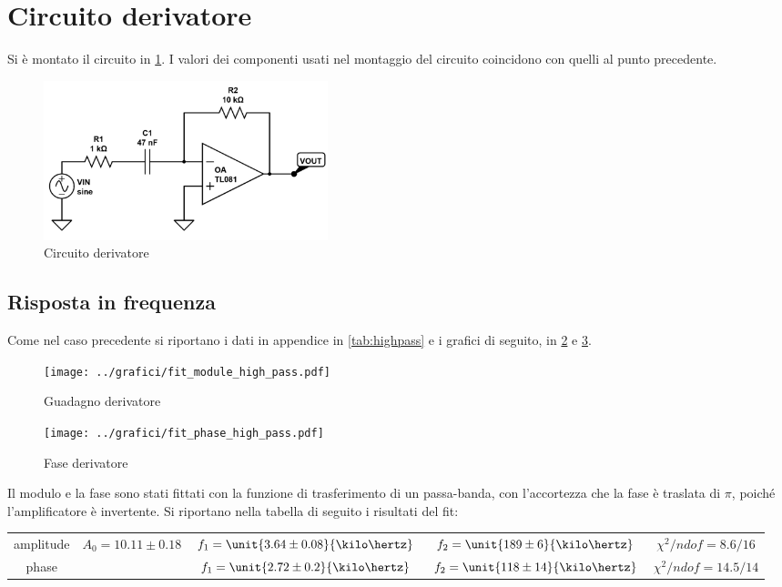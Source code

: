 \documentclass[10pt,a4paper]{article}
\begin{document}
\section{Circuito derivatore}

Si è montato il circuito in \figurename{\ref{derivatore}}. I valori dei componenti usati nel montaggio del circuito coincidono con quelli al punto precedente.

\begin{figure}[H]
	\centering
	\includegraphics[width=0.4\textwidth]{../grafici/derivatore_circuito.jpg}
	\caption{Circuito derivatore}
	\label{derivatore}
\end{figure}

\subsection{Risposta in frequenza}

Come nel caso precedente si riportano i dati in appendice in \tablename{\ref{tab:highpass}} e i grafici di seguito, in \figurename{\ref{fig:highamp}} e \figurename{\ref{fig:highph}}.

	\begin{figure}[H]
		\centering
		\texttt{[image: ../grafici/fit\_module\_high\_pass.pdf]}
		\caption{Guadagno derivatore}
		\label{fig:highamp}
	\end{figure}
	\begin{figure}[H]
		\centering
		\texttt{[image: ../grafici/fit\_phase\_high\_pass.pdf]}
		\caption{Fase derivatore}
		\label{fig:highph}
	\end{figure}

Il modulo e la fase sono stati fittati con la funzione di trasferimento di un passa-banda, con l'accortezza che la fase è traslata di $\pi$, poiché l'amplificatore è invertente. Si riportano nella tabella di seguito i risultati del fit:

\begin{table}[H]
\centering
\begin{tabular}{c|cccc}
amplitude	&	$A_0 = 10.11 \pm 0.18$	&	$f_1 = \unit{3.64 \pm 0.08}{\kilo\hertz}$	&	$f_2 = \unit{189 \pm 6}{\kilo\hertz}$	&	$\chi^2/ndof = 8.6 / 16$\\
phase		& &	$f_1 = \unit{2.72 \pm 0.2}{\kilo\hertz}$	&	$f_2 = \unit{118 \pm 14}{\kilo\hertz}$	&	$\chi^2/ndof = 14.5 / 14$
\end{tabular}
\end{table}
\end{document}

